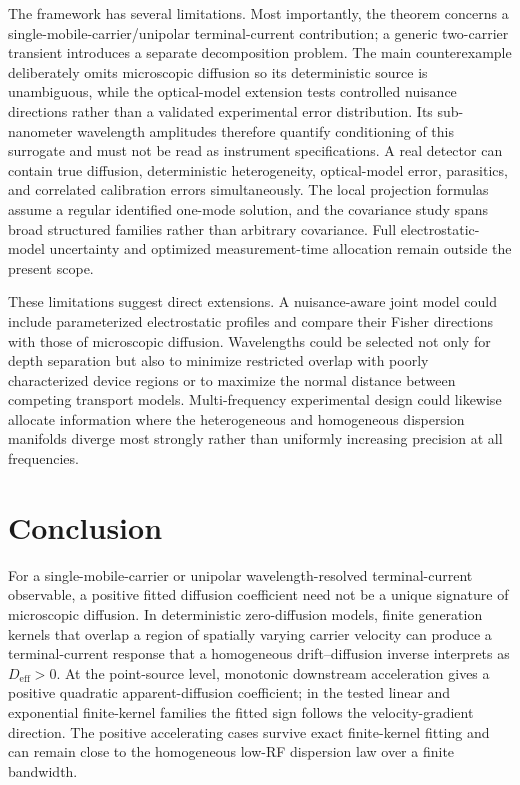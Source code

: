 \documentclass[aps,pra,twocolumn,superscriptaddress,nofootinbib]{revtex4-2}
\newcommand{\Deff}{D_{\mathrm{eff}}}
\begin{document}
The framework has several limitations. Most importantly, the theorem concerns a single-mobile-carrier/unipolar terminal-current contribution; a generic two-carrier transient introduces a separate decomposition problem. The main counterexample deliberately omits microscopic diffusion so its deterministic source is unambiguous, while the optical-model extension tests controlled nuisance directions rather than a validated experimental error distribution. Its sub-nanometer wavelength amplitudes therefore quantify conditioning of this surrogate and must not be read as instrument specifications. A real detector can contain true diffusion, deterministic heterogeneity, optical-model error, parasitics, and correlated calibration errors simultaneously. The local projection formulas assume a regular identified one-mode solution, and the covariance study spans broad structured families rather than arbitrary covariance. Full electrostatic-model uncertainty and optimized measurement-time allocation remain outside the present scope.

These limitations suggest direct extensions. A nuisance-aware joint model could include parameterized electrostatic profiles and compare their Fisher directions with those of microscopic diffusion. Wavelengths could be selected not only for depth separation but also to minimize restricted overlap with poorly characterized device regions or to maximize the normal distance between competing transport models. Multi-frequency experimental design could likewise allocate information where the heterogeneous and homogeneous dispersion manifolds diverge most strongly rather than uniformly increasing precision at all frequencies.

\section{Conclusion}

For a single-mobile-carrier or unipolar wavelength-resolved terminal-current observable, a positive fitted diffusion coefficient need not be a unique signature of microscopic diffusion. In deterministic zero-diffusion models, finite generation kernels that overlap a region of spatially varying carrier velocity can produce a terminal-current response that a homogeneous drift--diffusion inverse interprets as $\Deff>0$.  At the point-source level, monotonic downstream acceleration gives a positive quadratic apparent-diffusion coefficient; in the tested linear and exponential finite-kernel families the fitted sign follows the velocity-gradient direction.  The positive accelerating cases survive exact finite-kernel fitting and can remain close to the homogeneous low-RF dispersion law over a finite bandwidth.
\end{document}
